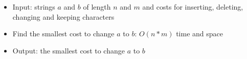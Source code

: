 \begin{itemize}
	\item Input: strings $a$ and $b$ of length $n$ and $m$ and costs for inserting, deleting, changing and keeping characters
	\item Find the smallest cost to change $a$ to $b$: $O(n*m)$ time and space
	\item Output: the smallest cost to change $a$ to $b$
\end{itemize}